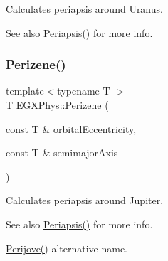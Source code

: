 Calculates periapsis around Uranus. 

\begin{DoxySeeAlso}{See also}
\hyperlink{group___periapsis_ga4414ac75539371ec874a3d25cad6c9fe}{Periapsis()} for more info. 
\end{DoxySeeAlso}
\mbox{\label{group___periapsis_ga0523c65b7fc26e675388b2c3d38aa00b}} 
\subsubsection{\texorpdfstring{Perizene()}{Perizene()}}
{\footnotesize\ttfamily template$<$typename T $>$ \\
T E\+G\+X\+Phys\+::\+Perizene (\begin{DoxyParamCaption}\item[{const T \&}]{orbital\+Eccentricity,  }\item[{const T \&}]{semimajor\+Axis }\end{DoxyParamCaption})}



Calculates periapsis around Jupiter. 

\begin{DoxySeeAlso}{See also}
\hyperlink{group___periapsis_ga4414ac75539371ec874a3d25cad6c9fe}{Periapsis()} for more info. 

\hyperlink{group___periapsis_ga075052f7ff9aa1d5fdf4501b493be86b}{Perijove()} alternative name. 
\end{DoxySeeAlso}
